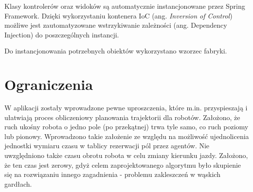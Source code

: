 Klasy kontrolerów oraz widoków są automatycznie instancjonowane przez Spring Framework. Dzięki wykorzystaniu kontenera IoC (ang. {\it Inversion of Control}) możliwe jest zautomatyzowane wstrzykiwanie zależności (ang. {Dependency Injection}) do poszczególnych instancji.

Do instancjonowania potrzebnych obiektów wykorzystano wzorzec fabryki.


\section{Ograniczenia}
W aplikacji zostały wprowadzone pewne uproszczenia, które m.in. przyspieszają i ułatwiają proces obliczeniowy planowania trajektorii dla robotów.
Założono, że ruch ukośny robota o jedno pole (po przekątnej) trwa tyle samo, co ruch poziomy lub pionowy. Wprowadzono takie założenie ze względu na możliwość ujednolicenia jednostki wymiaru czasu w tablicy rezerwacji pól przez agentów.
Nie uwzględniono także czasu obrotu robota w celu zmiany kierunku jazdy. Założono, że ten czas jest zerowy, gdyż celem zaprojektowanego algorytmu było skupienie się na rozwiązaniu innego zagadnienia - problemu zakleszczeń w wąskich gardłach.

